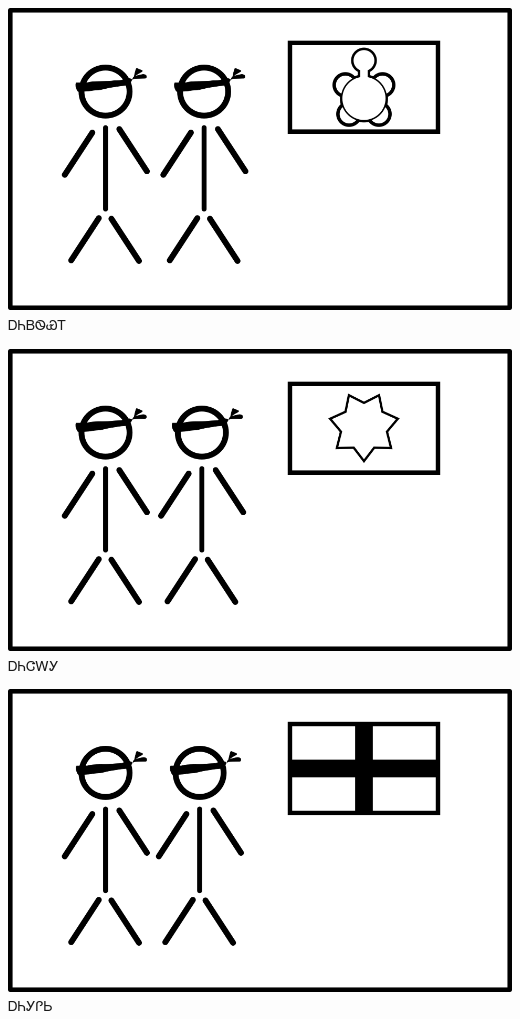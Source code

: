 \documentclass[avery5371]{flashcards}%
\begin{document}

    \begin{flashcard}{
        \includegraphics[width=0.95\columnwidth,height=.51\columnwidth,keepaspectratio]{../artwork/flags/anidaksi-flag-blind}
    }
        \Huge ᎠᏂᏴᏫᏯᎢ
    \end{flashcard}

    \begin{flashcard}{
        \includegraphics[width=0.95\columnwidth,height=.51\columnwidth,keepaspectratio]{../artwork/flags/anijalagi-flag-blind}
    }
        \Huge ᎠᏂᏣᎳᎩ
    \end{flashcard}

    \begin{flashcard}{
        \includegraphics[width=0.95\columnwidth,height=.51\columnwidth,keepaspectratio]{../artwork/flags/anigilisi-flag-blind}
    }
        \Huge ᎠᏂᎩᎵᏏ
    \end{flashcard}
\end{document}
